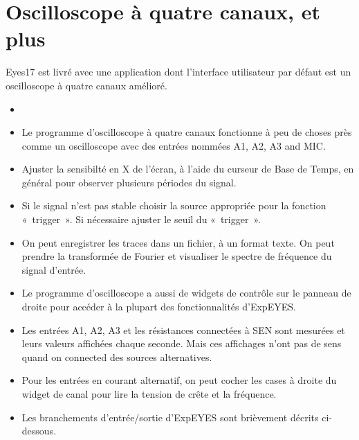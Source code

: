 \documentclass[a4paper,12pt,french]{sphinxmanual}
\begin{document}
\section{Oscilloscope à quatre canaux, et plus}
\label{\detokenize{3.0:oscilloscope-a-quatre-canaux-et-plus}}\label{\detokenize{3.0::doc}}
Eyes17 est livré avec une application dont l’interface utilisateur par défaut
est un oscilloscope à quatre canaux amélioré.
\begin{itemize}
\item {} 

\item {} 
Le programme d’oscilloscope à quatre canaux fonctionne à peu de choses
près comme un oscilloscope avec des entrées nommées
A1, A2, A3 and MIC.

\item {} 
Ajuster la sensibilté en X de l’écran, à l’aide du curseur de Base de Temps,
en général pour observer plusieurs périodes du signal.

\item {} 
Si le signal n’est pas stable choisir la source appropriée pour la fonction
« trigger ». Si nécessaire ajuster le seuil du « trigger ».

\item {} 
On peut enregistrer les traces dans un fichier, à un format texte. On peut
prendre la transformée de Fourier et visualiser le spectre de fréquence
du signal d’entrée.

\item {} 
Le programme d’oscilloscope a aussi de widgets de contrôle sur le panneau
de droite pour accéder à la plupart des fonctionnalités d’ExpEYES.

\item {} 
Les entrées A1, A2, A3 et les résistances connectées à SEN sont
mesurées et leurs valeurs affichées chaque seconde. Mais ces affichages
n’ont pas de sens quand on connected des sources alternatives.

\item {} 
Pour les entrées en courant alternatif, on peut cocher les cases à droite
du widget de canal pour lire la tension de crête et la fréquence.

\item {} 
Les branchements d’entrée/sortie d’ExpEYES sont brièvement décrits
ci-dessous.

\end{itemize}
\end{document}
